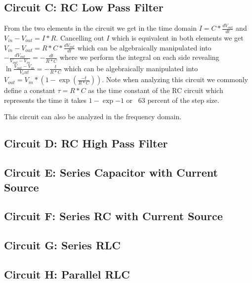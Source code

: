 \documentclass[main.tex]{subfiles}
\begin{document}
\subsection{Circuit C: RC Low Pass Filter}
From the two elements in the circuit we get in the time domain $I = C * \frac{dV_{out}}{dt}$ and $V_{in} - V_{out} = I * R$. Cancelling out $I$ which is equivalent in both elements we get $V_{in} - V_{out} = R * C * \frac{dV_{out}}{dt}$ which can be algebraically manipulated into $-\frac{dV_{out}}{V_{out}-V_{in}} = -\frac{dt}{R*C}$ where we perform the integral on each side revealing $\ln{\frac{V_{out}-V_{in}}{V_out}}=-\frac{t}{R*C}$ which can be algebraically manipulated into $V_{out}=V_{in}*(1-\exp(\frac{-t}{R*C}))$. Note when analyzing this circuit we commonly define a constant $\tau = R * C$ as the time constant of the RC circuit which represents the time it takes $1-\exp{-1}$ or ~63 percent of the step size. 


This circuit can also be analyzed in the frequency domain. 



\subsection{Circuit D: RC High Pass Filter}

\subsection{Circuit E: Series Capacitor with Current Source}

\subsection{Circuit F: Series RC with Current Source}

\subsection{Circuit G: Series RLC}

\subsection{Circuit H: Parallel RLC}
\end{document}
